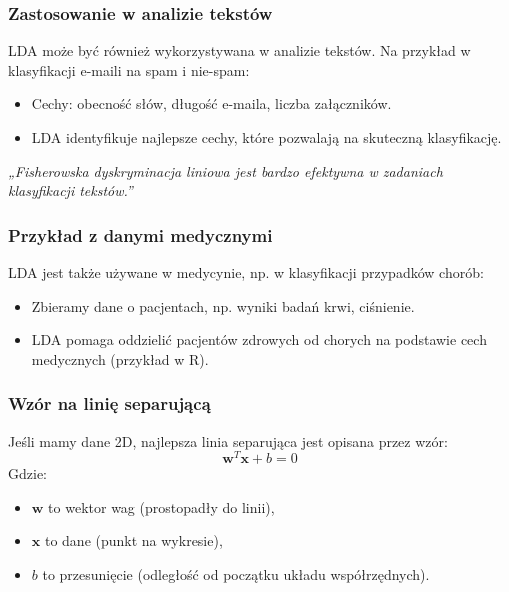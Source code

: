 \documentclass{beamer}
\begin{document}
\begin{frame}
    \frametitle{Zastosowanie w analizie tekstów}
    LDA może być również wykorzystywana w analizie tekstów. Na przykład w klasyfikacji e-maili na spam i nie-spam:
    \begin{itemize}
        \item Cechy: obecność słów, długość e-maila, liczba załączników.
        \item LDA identyfikuje najlepsze cechy, które pozwalają na skuteczną klasyfikację.
    \end{itemize}
    \textit{„Fisherowska dyskryminacja liniowa jest bardzo efektywna w zadaniach klasyfikacji tekstów.”}
\end{frame}

\begin{frame}
    \frametitle{Przykład z danymi medycznymi}
    LDA jest także używane w medycynie, np. w klasyfikacji przypadków chorób:
    \begin{itemize}
        \item Zbieramy dane o pacjentach, np. wyniki badań krwi, ciśnienie.
        \item LDA pomaga oddzielić pacjentów zdrowych od chorych na podstawie cech medycznych (przykład w R).
    \end{itemize}
\end{frame}

\begin{frame}
    \frametitle{Wzór na linię separującą}
    Jeśli mamy dane 2D, najlepsza linia separująca jest opisana przez wzór:
    \[
    \mathbf{w}^T \mathbf{x} + b = 0
    \]
    Gdzie:
    \begin{itemize}
        \item \( \mathbf{w} \) to wektor wag (prostopadły do linii),
        \item \( \mathbf{x} \) to dane (punkt na wykresie),
        \item \( b \) to przesunięcie (odległość od początku układu współrzędnych).
    \end{itemize}
\end{frame}
\end{document}
